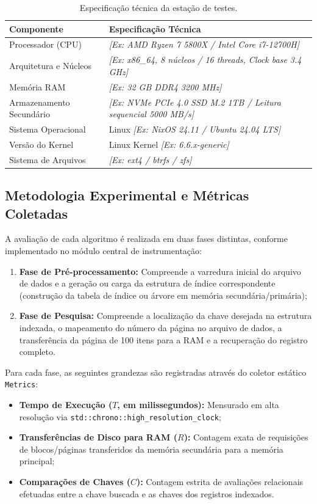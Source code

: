 \documentclass[12pt,a4paper]{article}
\begin{document}
\begin{table}[H]
\centering
\caption{Especificação técnica da estação de testes.}
\label{tab:hardware}
\begin{tabular}{p{} p{}}
\toprule
\textbf{Componente} & \textbf{Especificação Técnica} \\
\midrule
Processador (CPU) & \textit{[Ex: AMD Ryzen 7 5800X / Intel Core i7-12700H]} \\
Arquitetura e Núcleos & \textit{[Ex: x86\_64, 8 núcleos / 16 threads, Clock base 3.4 GHz]} \\
Memória RAM & \textit{[Ex: 32 GB DDR4 3200 MHz]} \\
Armazenamento Secundário & \textit{[Ex: NVMe PCIe 4.0 SSD M.2 1TB / Leitura sequencial 5000 MB/s]} \\
Sistema Operacional & Linux \textit{[Ex: NixOS 24.11 / Ubuntu 24.04 LTS]} \\
Versão do Kernel & Linux Kernel \textit{[Ex: 6.6.x-generic]} \\
Sistema de Arquivos & \textit{[Ex: ext4 / btrfs / zfs]} \\
\bottomrule
\end{tabular}
\end{table}

\subsection{Metodologia Experimental e Métricas Coletadas}
A avaliação de cada algoritmo é realizada em duas fases distintas, conforme implementado no módulo central de instrumentação:
\begin{enumerate}
    \item \textbf{Fase de Pré-processamento:} Compreende a varredura inicial do arquivo de dados e a geração ou carga da estrutura de índice correspondente (construção da tabela de índice ou árvore em memória secundária/primária);
    \item \textbf{Fase de Pesquisa:} Compreende a localização da chave desejada na estrutura indexada, o mapeamento do número da página no arquivo de dados, a transferência da página de 100 itens para a RAM e a recuperação do registro completo.
\end{enumerate}

Para cada fase, as seguintes grandezas são registradas através do coletor estático \texttt{Metrics}:
\begin{itemize}
    \item \textbf{Tempo de Execução ($T$, em milissegundos):} Mensurado em alta resolução via \texttt{std::chrono::}\allowbreak\texttt{high\_resolution\_clock};
    \item \textbf{Transferências de Disco para RAM ($R$):} Contagem exata de requisições de blocos/páginas transferidos da memória secundária para a memória principal;
    \item \textbf{Comparações de Chaves ($C$):} Contagem estrita de avaliações relacionais efetuadas entre a chave buscada e as chaves dos registros indexados.
\end{itemize}
\end{document}
